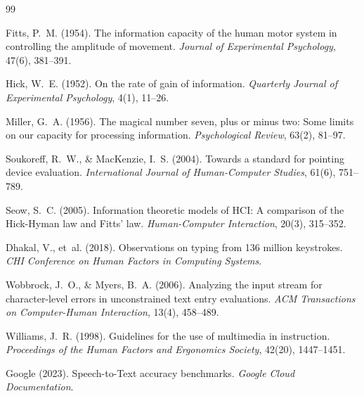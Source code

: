 \documentclass[11pt, a4paper]{article}
\begin{document}
\begin{thebibliography}{99}

Fitts, P.~M. (1954).
\newblock The information capacity of the human motor system in controlling the
  amplitude of movement.
\newblock \emph{Journal of Experimental Psychology}, 47(6), 381--391.

Hick, W.~E. (1952).
\newblock On the rate of gain of information.
\newblock \emph{Quarterly Journal of Experimental Psychology}, 4(1), 11--26.

Miller, G.~A. (1956).
\newblock The magical number seven, plus or minus two: Some limits on our
  capacity for processing information.
\newblock \emph{Psychological Review}, 63(2), 81--97.

Soukoreff, R.~W., \& MacKenzie, I.~S. (2004).
\newblock Towards a standard for pointing device evaluation.
\newblock \emph{International Journal of Human-Computer Studies}, 61(6),
  751--789.

Seow, S.~C. (2005).
\newblock Information theoretic models of HCI: A comparison of the Hick-Hyman
  law and Fitts' law.
\newblock \emph{Human-Computer Interaction}, 20(3), 315--352.

Dhakal, V., et~al. (2018).
\newblock Observations on typing from 136 million keystrokes.
\newblock \emph{CHI Conference on Human Factors in Computing Systems}.

Wobbrock, J.~O., \& Myers, B.~A. (2006).
\newblock Analyzing the input stream for character-level errors in unconstrained
  text entry evaluations.
\newblock \emph{ACM Transactions on Computer-Human Interaction}, 13(4),
  458--489.

Williams, J.~R. (1998).
\newblock Guidelines for the use of multimedia in instruction.
\newblock \emph{Proceedings of the Human Factors and Ergonomics Society}, 42(20),
  1447--1451.

Google (2023).
\newblock Speech-to-Text accuracy benchmarks.
\newblock \emph{Google Cloud Documentation}.

\end{thebibliography}
\end{document}

